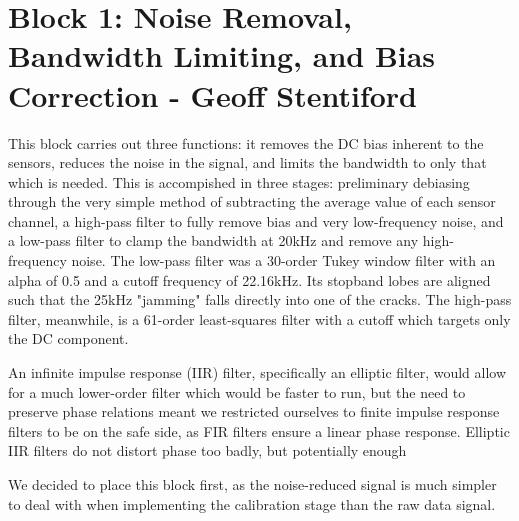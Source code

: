 
\section{Block 1: Noise Removal, Bandwidth Limiting, and Bias Correction - Geoff Stentiford}

This block carries out three functions: it removes the DC bias inherent to the sensors, reduces the noise
 in the signal, and limits the bandwidth to only that which is needed. This is accompished in three stages:
 preliminary debiasing through the very simple method of subtracting the average value of each sensor channel,
 a high-pass filter to fully remove bias and very low-frequency noise, and a low-pass filter to clamp the
 bandwidth at 20kHz and remove any high-frequency noise. The low-pass filter was a 30-order Tukey window filter
 with an alpha of 0.5 and a cutoff frequency of 22.16kHz. Its stopband lobes are aligned such that the 25kHz
 "jamming" falls directly into one of the cracks.  The high-pass filter, meanwhile, is a 61-order least-squares
 filter with a cutoff which targets only the DC component.

An infinite impulse response (IIR) filter, specifically an elliptic filter, would allow for a much lower-order
 filter which would be faster to run, but the need to preserve phase relations meant we restricted ourselves to
 finite impulse response filters to be on the safe side, as FIR filters ensure a linear phase response. Elliptic
 IIR filters do not distort phase too badly, but potentially enough

We decided to place this block first, as the noise-reduced signal is much simpler to deal with when implementing
 the calibration stage than the raw data signal.